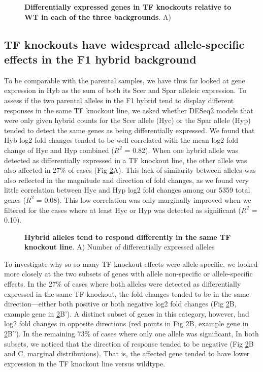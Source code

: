 \begin{figure}
     \caption{\textbf{Differentially expressed genes in TF knockouts relative to WT in each of the three backgrounds}. A)}
    \label{fig:tfdel}
\end{figure}

\subsection{TF knockouts have widespread allele-specific effects in the F1 hybrid background}

To be comparable with the parental samples, we have thus far looked at gene expression in Hyb as the sum of both its Scer and Spar alleleic expression. To assess if the two parental alleles in the F1 hybrid tend to display different responses in the same TF knockout line, we asked whether DESeq2 models that were only given hybrid counts for the Scer allele (Hyc) or the Spar allele (Hyp) tended to detect the same genes as being differentially expressed. We found that Hyb log2 fold changes tended to be well correlated with the mean log2 fold change of Hyc and Hyp combined ($R^2$ = 0.82). When one hybrid allele was detected as differentially expressed in a TF knockout line, the other allele was also affected in 27\% of cases (Fig \ref{fig:alleleic}A). This lack of similarity between alleles was also reflected in the magnitude and direction of fold changes, as we found very little correlation between Hyc and Hyp log2 fold changes among our 5359 total genes ($R^2$ = 0.08). This low correlation was only marginally improved when we filtered for the cases where at least Hyc or Hyp was detected as significant ($R^2$ = 0.10).

\begin{figure}
     \caption{\textbf{Hybrid alleles tend to respond differently in the same TF knockout line}. A) Number of differentially expressed alleles}
    \label{fig:alleleic}
\end{figure}

To investigate why so so many TF knockout effects were allele-specific, we looked more closely at the two subsets of genes with allele non-specific or allele-specific effects. In the 27\% of cases where both alleles were detected as differentially expressed in the same TF knockout, the fold changes tended to be in the same direction---either both positive or both negative log2 fold changes (Fig \ref{fig:alleleic}B, example gene in \ref{fig:alleleic}B'). A distinct subset of genes in this category, however, had log2 fold changes in opposite directions (red points in Fig \ref{fig:alleleic}B, example gene in \ref{fig:alleleic}B''). In the remaining 73\% of cases where only one allele was significant, In both subsets, we noticed that the direction of response tended to be negative (Fig \ref{fig:alleleic}B and C, marginal distributions). That is, the affected gene tended to have lower expression in the TF knockout line versus wildtype.

